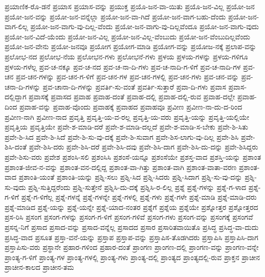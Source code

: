 {ಪ್ರಯಾಣಿಕ-ರೊ-ಡನೆ
ಪ್ರಯಾಸ
ಪ್ರಯಾಸ-ವನ್ನು
ಪ್ರಯುಕ್ತ
ಪ್ರಯೊ-ಜನ-ವಾ-ಯಿತು
ಪ್ರಯೊ-ಜನ-ವಿಲ್ಲ
ಪ್ರಯೋ-ಜನ
ಪ್ರಯೋ-ಜನ-ವನ್ನು
ಪ್ರಯೋ-ಜನ-ವನ್ನೆಲ್ಲಾ
ಪ್ರಯೋ-ಜನ-ವಾ-ಗಿದೆ
ಪ್ರಯೋ-ಜನ-ವಾಗ-ಬಹು-ದೆಂದು
ಪ್ರಯೋ-ಜನ-ವಾಗ-ಲಿಲ್ಲ
ಪ್ರಯೋ-ಜನ-ವಾಗು-ವು-ದಿಲ್ಲ-ವೆಂದು
ಪ್ರಯೋ-ಜನ-ವಾಗು-ವು-ದಿಲ್ಲವೆಂದೂ
ಪ್ರಯೋ-ಜನ-ವಾಗು-ವುದು
ಪ್ರಯೋ-ಜನ-ವಿದೆ-ಯೆಂದು
ಪ್ರಯೋ-ಜನ-ವಿಲ್ಲ
ಪ್ರಯೋ-ಜನ-ವಿಲ್ಲ-ವೆಂಬುದು
ಪ್ರಯೋ-ಜನ-ವೆಂಬುದಿಲ್ಲವೆಂದು
ಪ್ರಯೋ-ಜನ-ವೇನು
ಪ್ರಯೋ-ಜನವೂ
ಪ್ರಯೋಗ
ಪ್ರಯೋಗ-ಮಾಡಿ
ಪ್ರಯೋಗ-ವನ್ನು
ಪ್ರಯೋಜ-ನಕ್ಕೆ
ಪ್ರಲಾಪ-ವನ್ನು
ಪ್ರಲೋಭ-ನದ
ಪ್ರಲೋಭ-ನೆಯ
ಪ್ರಲೋಭನ-ಗಳು
ಪ್ರಲೋಭನೆ-ಗಳು
ಪ್ರಳಯ
ಪ್ರಳಯ-ಗಳನ್ನು
ಪ್ರಳಯ-ಗಳಿಗೂ
ಪ್ರಳಯ-ಗಳೆಲ್ಲ
ಪ್ರವ-ಚ-ನಕ್ಕೂ
ಪ್ರವ-ಚ-ನದ
ಪ್ರವ-ಚ-ನಾ-ದಿ-ಗಳು
ಪ್ರವ-ಚ-ನಾದಿ-ಗ-ಳಿಗೆ
ಪ್ರವ-ಚ-ನಾದಿ-ಗಳ
ಪ್ರವ-ಚನ
ಪ್ರವ-ಚನ-ಗಳನ್ನು
ಪ್ರವ-ಚನ-ಗ-ಳಿಗೆ
ಪ್ರವ-ಚನ-ಗಳ
ಪ್ರವ-ಚನ-ಗಳಲ್ಲಿ
ಪ್ರವ-ಚನ-ಗಳು
ಪ್ರವ-ಚನ-ವನ್ನು
ಪ್ರವ-ಚನಾ-ದಿ-ಗಳನ್ನು
ಪ್ರವ-ಚಾನಾ-ದಿ-ಗಳನ್ನು
ಪ್ರವರ್ತಿ-ಸು-ವಂತೆ
ಪ್ರವರ್ತಿ-ಸುತ್ತಾರೆ
ಪ್ರವಾ-ದಿ-ಗಳು
ಪ್ರವಾಸ
ಪ್ರವಾಸ-ದಲ್ಲಿದ್ದಾಗ
ಪ್ರವಾಸಕ್ಕೆ
ಪ್ರವಾಸದ
ಪ್ರವಾಹ
ಪ್ರವಾಹ-ದಂತೆ
ಪ್ರವಾಹ-ದಲ್ಲಿ
ಪ್ರವಾಹ-ದಲ್ಲಿ-ರುವ
ಪ್ರವಾಹ-ದಲ್ಲೇ
ಪ್ರವಾಹ-ದಿಂದ
ಪ್ರವಾಹ-ವನ್ನು
ಪ್ರವಾಹ-ವೊಂದು
ಪ್ರವಾಹಕ್ಕೆ
ಪ್ರವಾಹದ
ಪ್ರವಾಹವೂ
ಪ್ರವೀಣ
ಪ್ರವೀಣ-ನಾ-ದು-ದ-ರಿಂದ
ಪ್ರವೀಣ-ನಾಗಿ
ಪ್ರವೀಣ-ನಾದ
ಪ್ರವೃತ್ತಿ
ಪ್ರವೃತ್ತಿ-ಯ-ವ-ರಲ್ಲ
ಪ್ರವೃತ್ತಿ-ಯ-ವರು
ಪ್ರವೃತ್ತಿ-ಯನ್ನು
ಪ್ರವೃತ್ತಿ-ಯಲ್ಲಿಯೇ
ಪ್ರವೃತ್ತಿಯ
ಪ್ರವೃತ್ತಿಯೇ
ಪ್ರವೇ-ಶ-ಮಾಡಿ-ದರೆ
ಪ್ರವೇ-ಶ-ಮಾಡಿ-ದಲ್ಲದೆ
ಪ್ರವೇ-ಶ-ಮಾಡಿ-ಸ-ಬೇಕು
ಪ್ರವೇ-ಶಿ-ಸಿತು
ಪ್ರವೇ-ಶಿ-ಸಿದ
ಪ್ರವೇ-ಶಿ-ಸಿದೆ
ಪ್ರವೇ-ಶಿ-ಸು-ವು-ದಕ್ಕೆ
ಪ್ರವೇ-ಶಿ-ಸುವಾಗ
ಪ್ರವೇ-ಶಿಸ-ಲಾಗು-ವು-ದಿಲ್ಲ
ಪ್ರವೇ-ಶಿಸಿ
ಪ್ರವೇ-ಶಿಸಿ-ದಂತೆ
ಪ್ರವೇ-ಶಿಸಿ-ದರು
ಪ್ರವೇ-ಶಿಸಿ-ದರೆ
ಪ್ರವೇ-ಶಿಸಿ-ದವು
ಪ್ರವೇ-ಶಿಸಿ-ದಾಗ
ಪ್ರವೇ-ಶಿಸಿ-ದು-ದನ್ನು
ಪ್ರವೇ-ಶಿಸಿದ್ದರು
ಪ್ರವೇ-ಶಿಸು-ವರು
ಪ್ರವೇಶ
ಪ್ರಶಂಸಿ-ಸಲಿ
ಪ್ರಶಂಸಿಸಿ
ಪ್ರಶಂಸೆ-ಯನ್ನೂ
ಪ್ರಶಂಸೆಯೇ
ಪ್ರಶಸ್ತ-ವಾದ
ಪ್ರಶಸ್ತಿ-ಯನ್ನು
ಪ್ರಶಾಂತ
ಪ್ರಶಾಂತ-ಜೀವ-ನ-ವನ್ನು
ಪ್ರಶಾಂತ-ವನ-ದಲ್ಲಿದ್ದ
ಪ್ರಶಾಂತ-ವಾ-ಗಿತ್ತು
ಪ್ರಶಾಂತ-ವಾಗಿ
ಪ್ರಶಾಂತ-ವಾತಾ-ವರಣ
ಪ್ರಶಾಂತ-ವಾದ
ಪ್ರಶಾಂತಿ-ಯಂತೆ
ಪ್ರಶಾಂತಿ-ಯನ್ನು
ಪ್ರಶ್ನಿ-ಸಲು
ಪ್ರಶ್ನಿ-ಸಿದ
ಪ್ರಶ್ನಿ-ಸಿದರು
ಪ್ರಶ್ನಿ-ಸಿದಾಗ
ಪ್ರಶ್ನಿ-ಸು-ವು-ದನ್ನು
ಪ್ರಶ್ನಿ-ಸು-ವುದು
ಪ್ರಶ್ನಿ-ಸುತ್ತಿದ್ದರೆಂದು
ಪ್ರಶ್ನಿ-ಸುತ್ತೇನೆ
ಪ್ರಶ್ನಿಸಿ-ದು-ದಕ್ಕೆ
ಪ್ರಶ್ನಿಸಿ-ರ-ಲಿಲ್ಲ
ಪ್ರಶ್ನೆ
ಪ್ರಶ್ನೆ-ಗಳನ್ನು
ಪ್ರಶ್ನೆ-ಗ-ಳಾದ
ಪ್ರಶ್ನೆ-ಗ-ಳಿಗೆ
ಪ್ರಶ್ನೆ-ಗ-ಳಿಗೆಲ್ಲ
ಪ್ರಶ್ನೆ-ಗಳನ್ನೆ
ಪ್ರಶ್ನೆ-ಗಳನ್ನೇ
ಪ್ರಶ್ನೆ-ಗಳಲ್ಲಿ
ಪ್ರಶ್ನೆ-ಗಳು
ಪ್ರಶ್ನೆ-ಗಳೇ
ಪ್ರಶ್ನೆ-ಮಾಡಿ
ಪ್ರಶ್ನೆ-ಮಾಡಿ-ದರು
ಪ್ರಶ್ನೆ-ಮಾಡಿದ
ಪ್ರಶ್ನೆ-ಯನ್ನು
ಪ್ರಶ್ನೆ-ಯನ್ನೇ
ಪ್ರಶ್ನೆ-ಯಾದ-ನಂತರ
ಪ್ರಶ್ನೆಗೆ
ಪ್ರಶ್ನೆಯ
ಪ್ರಶ್ನೆಯೇ
ಪ್ರಶ್ನೋತ್ತರ
ಪ್ರಶ್ನೋತ್ತರದ
ಪ್ರಸ-ರಿಸಿ
ಪ್ರಸಂಗ
ಪ್ರಸಂಗ-ಗಳನ್ನು
ಪ್ರಸಂಗ-ಗ-ಳಿಗೆ
ಪ್ರಸಂಗ-ಗಳಿವೆ
ಪ್ರಸಂಗ-ಗಳು
ಪ್ರಸಂಗ-ವನ್ನು
ಪ್ರಸಂಗಕ್ಕೆ
ಪ್ರಸಂಗವೆ
ಪ್ರಸನ್ನ-ನಿಗೆ
ಪ್ರಸಾದ
ಪ್ರಸಾದ-ವನ್ನು
ಪ್ರಸಾದ-ವನ್ನೆಲ್ಲ
ಪ್ರಸಾದದ
ಪ್ರಸಾರ
ಪ್ರಸಾರಿತವಾಯಿತೊ
ಪ್ರಸಿದ್ಧ
ಪ್ರಸಿದ್ಧ-ವಾ-ದುದು
ಪ್ರಸಿದ್ಧ-ವಾದ
ಪ್ರಸೂತ
ಪ್ರಸ್ತಾ-ವನೆ-ಯನ್ನು
ಪ್ರಸ್ತಾಪ
ಪ್ರಸ್ತಾಪ-ವನ್ನು
ಪ್ರಸ್ತಾಪಿಸ-ತೊಡಗಿದರು
ಪ್ರಸ್ತಾಪಿಸಿ
ಪ್ರಸ್ತಾಪಿಸಿ-ದಾಗ
ಪ್ರಸ್ತಾಪಿಸು-ವರು
ಪ್ರಸ್ಥಾನೇ
ಪ್ರಹಾರ-ಗಳಿಂದ
ಪ್ರಹಾರ-ದಂತೆ
ಪ್ರಾಂಗಣ
ಪ್ರಾಂಗಣ-ದಲ್ಲಿ
ಪ್ರಾಂಗಣ-ವನ್ನು
ಪ್ರಾಂಗಣ-ವನ್ನೇ
ಪ್ರಾಂತ್ಯ-ಗ-ಳಿಗೆ
ಪ್ರಾಂತ್ಯ-ಗಳ
ಪ್ರಾಂತ್ಯ-ಗಳಲ್ಲಿ
ಪ್ರಾಂತ್ಯ-ಗಳು
ಪ್ರಾಂತ್ಯ-ದಲ್ಲಿ
ಪ್ರಾಂತ್ಯದ
ಪ್ರಾಂತ್ಯದಲ್ಲಿ-ರುವ
ಪ್ರಾಕ್ತನ
ಪ್ರಾಚೀನ
ಪ್ರಾಚೀನ-ಕಾಲದ
ಪ್ರಾಚೀನ-ತಮ
}
